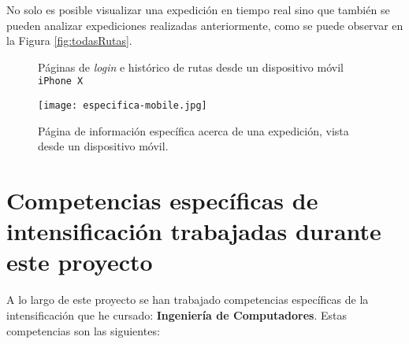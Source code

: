 No solo es posible visualizar una expedición en tiempo real sino que también se pueden analizar expediciones realizadas anteriormente, como se puede observar en la Figura \ref{fig:todasRutas}.

\begin{figure}
 \centering
    
  \caption{Páginas de \textit{login} e histórico de rutas desde un dispositivo móvil \texttt{iPhone X}}
  \label{fig:fig1mobile}
\end{figure}

\begin{figure}[!h]
\begin{center}
\texttt{[image: especifica-mobile.jpg]}
\caption{Página de información específica acerca de una expedición, vista desde un dispositivo móvil.}
\label{fig:fig2mobile}
\end{center}
\end{figure}

\section{Competencias específicas de intensificación trabajadas durante este proyecto}
\label{competencias-inten}

A lo largo de este proyecto se han trabajado competencias específicas de la intensificación que he cursado: \textbf{Ingeniería de Computadores}. Estas competencias son las siguientes:

